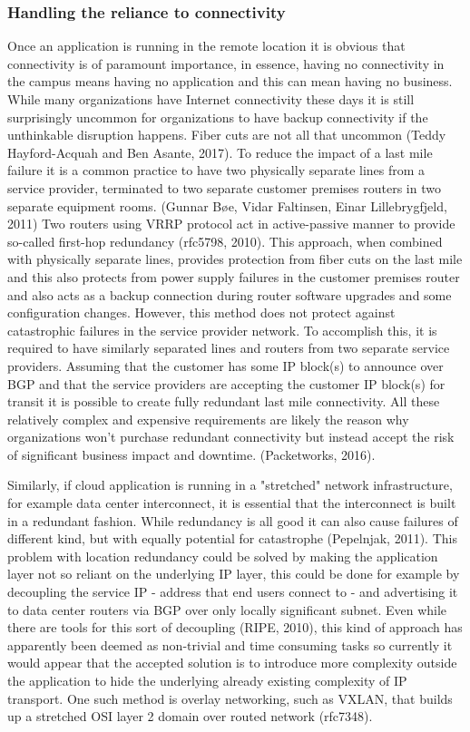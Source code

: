 \documentclass{article}
\begin{document}
\subsubsection{Handling the reliance to connectivity}
Once an application is running in the remote location it is obvious that connectivity is of paramount importance, in essence, having no connectivity in the campus means having no application and this can mean having no business. While many organizations have Internet connectivity these days it is still surprisingly uncommon for organizations to have backup connectivity if the unthinkable disruption happens. Fiber cuts are not all that uncommon (Teddy Hayford-Acquah and Ben Asante, 2017).
To reduce the impact of a last mile failure it is a common practice to have two physically separate lines from a service provider, terminated to two separate customer premises routers in two separate equipment rooms. (Gunnar Bøe, Vidar Faltinsen, Einar Lillebrygfjeld, 2011) Two routers using VRRP protocol act in active-passive manner to provide so-called first-hop redundancy (rfc5798, 2010). This approach, when combined with physically separate lines, provides protection from fiber cuts on the last mile and this also protects from power supply failures in the customer premises router and also acts as a backup connection during router software upgrades and some configuration changes.
However, this method does not protect against catastrophic failures in the service provider network. To accomplish this, it is required to have similarly separated lines and routers from two separate service providers. Assuming that the customer has some IP block(s) to announce over BGP and that the service providers are accepting the customer IP block(s) for transit it is possible to create fully redundant last mile connectivity. All these relatively complex and expensive requirements are likely the reason why organizations won't purchase redundant connectivity but instead accept the risk of significant business impact and downtime. (Packetworks, 2016).
\par
Similarly, if cloud application is running in a "stretched" network infrastructure, for example data center interconnect, it is essential that the interconnect is built in a redundant fashion. While redundancy is all good it can also cause failures of different kind, but with equally potential for catastrophe (Pepelnjak, 2011).
This problem with location redundancy could be solved by making the application layer not so reliant on the underlying IP layer, this could be done for example by decoupling the service IP - address that end users connect to - and advertising it to data center routers via BGP over only locally significant subnet. Even while there are tools for this sort of decoupling (RIPE, 2010), this kind of approach has apparently been deemed as non-trivial and time consuming tasks so currently it would appear that the accepted solution is to introduce more complexity outside the application to hide the underlying already existing complexity of IP transport. One such method is overlay networking, such as VXLAN, that builds up a stretched OSI layer 2 domain over routed network (rfc7348).
\end{document}
